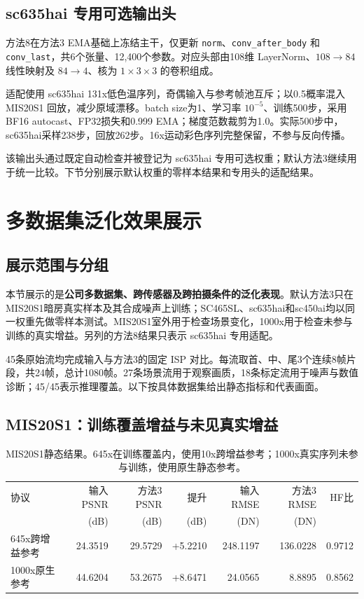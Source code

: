 \documentclass[11pt,a4paper,UTF8,fontset=fandol]{ctexart}
\begin{document}
\subsection{sc635hai 专用可选输出头}
\label{sec:head}

方法8在方法3 EMA基础上冻结主干，仅更新 \texttt{norm}、\texttt{conv\_after\_body} 和 \texttt{conv\_last}，共6个张量、12,400个参数。对应头部由108维 LayerNorm、$108\rightarrow84$线性映射及 $84\rightarrow4$、核为 $1\times3\times3$ 的卷积组成。

适配使用 sc635hai 131x低色温序列，奇偶输入与参考帧池互斥；以0.5概率混入 MIS20S1 回放，减少原域漂移。batch size为1、学习率 $10^{-5}$、训练500步，采用BF16 autocast、FP32损失和0.999 EMA；梯度范数裁剪为1.0。实际500步中，sc635hai采样238步，回放262步。16x运动彩色序列完整保留，不参与反向传播。

该输出头通过既定自动检查并被登记为 sc635hai 专用可选权重；默认方法3继续用于统一比较。下节分别展示默认权重的零样本结果和专用头的适配结果。

\section{多数据集泛化效果展示}
\label{sec:results}

\subsection{展示范围与分组}

本节展示的是\textbf{公司多数据集、跨传感器及跨拍摄条件的泛化表现}。默认方法3只在 MIS20S1暗房真实样本及其合成噪声上训练；SC465SL、sc635hai和sc450ai均以同一权重先做零样本测试。MIS20S1室外用于检查场景变化，1000x用于检查未参与训练的真实增益。另列的方法8结果只表示 sc635hai 专用适配。

45条原始流均完成输入与方法3的固定 ISP 对比。每流取首、中、尾3个连续8帧片段，共24帧，总计1080帧。27条场景流用于观察画质，18条标定流用于噪声与数值诊断；45/45表示推理覆盖。以下按具体数据集给出静态指标和代表画面。

\subsection{MIS20S1：训练覆盖增益与未见真实增益}

\begin{table}[!htbp]
\centering\small
\caption{MIS20S1静态结果。645x在训练覆盖内，使用10x跨增益参考；1000x真实序列未参与训练，使用原生静态参考。}
\label{tab:mis20s1}
\begin{tabular}{lrrrrrr}
\toprule
协议 & 输入PSNR & 方法3 PSNR & 提升 & 输入RMSE & 方法3 RMSE & HF比 \\
 & (dB) & (dB) & (dB) & (DN) & (DN) & \\
\midrule
645x跨增益参考 & 24.3519 & 29.5729 & +5.2210 & 248.1197 & 136.0228 & 0.9712 \\
1000x原生参考 & 44.6204 & 53.2675 & +8.6471 & 24.0565 & 8.8895 & 0.8562 \\
\bottomrule
\end{tabular}
\end{table}
\end{document}
